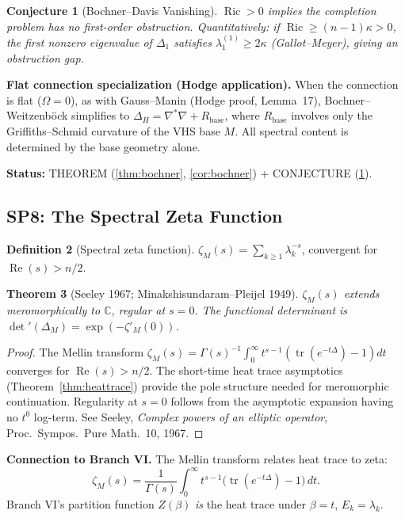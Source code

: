 \documentclass[11pt]{article}
\newtheorem{theorem}{Theorem}[section]
\newtheorem{conjecture}[theorem]{Conjecture}
\theoremstyle{definition}
\newtheorem{definition}[theorem]{Definition}
\theoremstyle{remark}
\newcommand{\Ric}{\operatorname{Ric}}
\begin{document}
\begin{conjecture}[Bochner--Davis Vanishing]\label{conj:bochner}
$\Ric > 0$ implies the completion problem has no first-order obstruction. Quantitatively: if $\Ric \ge (n-1)\kappa > 0$, the first nonzero eigenvalue of $\Delta_1$ satisfies $\lambda_1^{(1)} \ge 2\kappa$ (Gallot--Meyer), giving an obstruction gap.
\end{conjecture}

\textbf{Flat connection specialization (Hodge application).} When the connection is flat ($\Omega = 0$), as with Gauss--Manin (Hodge proof, Lemma~17), Bochner--Weitzenb\"{o}ck simplifies to $\Delta_H = \nabla^*\nabla + R_{\mathrm{base}}$, where $R_{\mathrm{base}}$ involves only the Griffiths--Schmid curvature of the VHS base $M$. All spectral content is determined by the base geometry alone.

\textbf{Status:} THEOREM (\ref{thm:bochner}, \ref{cor:bochner}) + CONJECTURE (\ref{conj:bochner}).


\subsection{SP8: The Spectral Zeta Function}

\begin{definition}[Spectral zeta function]
$\zeta_M(s) = \sum_{k \ge 1} \lambda_k^{-s}$, convergent for $\operatorname{Re}(s) > n/2$.
\end{definition}

\begin{theorem}[Seeley 1967; Minakshisundaram--Pleijel 1949]\label{thm:zeta}
$\zeta_M(s)$ extends meromorphically to $\mathbb{C}$, regular at $s = 0$. The functional determinant is $\det'(\Delta_M) = \exp(-\zeta'_M(0))$.
\end{theorem}

\begin{proof}
The Mellin transform $\zeta_M(s) = \Gamma(s)^{-1}\int_0^\infty t^{s-1}(\operatorname{tr}(e^{-t\Delta}) - 1)dt$ converges for $\operatorname{Re}(s) > n/2$. The short-time heat trace asymptotics (Theorem~\ref{thm:heattrace}) provide the pole structure needed for meromorphic continuation. Regularity at $s = 0$ follows from the asymptotic expansion having no $t^0$ log-term. See Seeley, \emph{Complex powers of an elliptic operator}, Proc.\ Sympos.\ Pure Math.\ 10, 1967.
\end{proof}

\textbf{Connection to Branch VI.} The Mellin transform relates heat trace to zeta:
\[
\zeta_M(s) = \frac{1}{\Gamma(s)}\int_0^\infty t^{s-1}\bigl(\operatorname{tr}(e^{-t\Delta}) - 1\bigr)\,dt.
\]
Branch VI's partition function $Z(\beta)$ \emph{is} the heat trace under $\beta = t$, $E_k = \lambda_k$.
\end{document}
